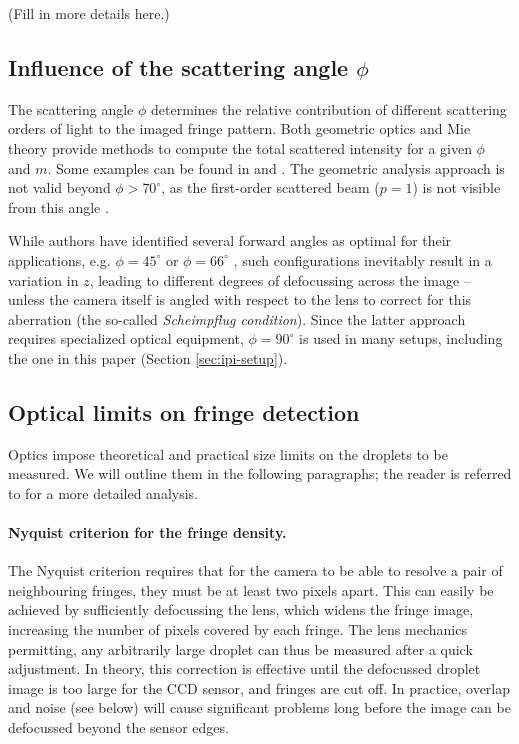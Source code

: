 \documentclass[11.5pt]{book}
\begin{document}
(Fill in more details here.)
\subsection{Influence of the scattering angle $\phi$}
The scattering angle $\phi$ determines the relative contribution of 
different scattering orders of light to the imaged fringe pattern. Both
geometric optics \cite{Vandehulst12} and Mie theory provide methods to compute
the total scattered intensity for a given $\phi$ and $m$. Some examples can be
found in \citet{Kawaguchi02} and \citet{Mounaim99}. The geometric analysis
approach is not valid beyond $\phi > 70^\circ$, as the first-order
scattered beam ($p=1$) is not visible from this angle \cite{Glover95}.

While authors have identified several forward angles as optimal for their
applications, e.g. $\phi = 45^\circ$ \cite{Glover95} or $\phi = 66^\circ$
\cite{Mounaim99}, such configurations inevitably result in a variation in $z$,
leading to different degrees of defocussing across the image -- unless the
camera itself is angled with respect to the lens to correct for this
aberration (the so-called \emph{Scheimpflug condition}). Since the latter
approach requires specialized optical equipment, $\phi = 90^\circ$ is used in
many setups, including the one in this paper (Section \ref{sec:ipi-setup}).

\subsection{Optical limits on fringe detection}
\label{sec:ipi-fringelimits}
Optics impose theoretical and practical size limits on the droplets to be
measured. We will outline them in the following paragraphs; the reader is
referred to \citet{Damaschke02} for a more detailed analysis.

\paragraph{Nyquist criterion for the fringe density.}
The Nyquist criterion requires that for the camera to be able to resolve a pair
of neighbouring fringes, they must be at least two pixels apart. This can easily
be achieved by sufficiently defocussing the lens, which widens the fringe image,
increasing the number of pixels covered by each fringe. The lens mechanics
permitting, any arbitrarily large droplet can thus be measured after a quick
adjustment. In theory, this correction is effective until the defocussed droplet
image is too large for the CCD sensor, and fringes are cut off. In practice,
overlap and noise (see below) will cause significant problems long before the
image can be defocussed beyond the sensor edges.
\end{document}
